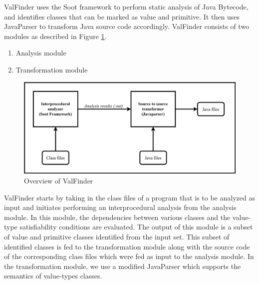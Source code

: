 \documentclass[12 pt, a4paper]{article}
\begin{document}
	

ValFinder uses the Soot framework \citep{soot} to perform static analysis
of Java Bytecode, and identifies classes that can be marked as value
and primitive. It then uses JavaParser \citep{JP} to transform Java source
code accordingly. ValFinder consists of two modules as described in Figure \ref{fig:Figure 3}.
\begin{enumerate}
	\item Analysis module
	\item Transformation module
\end{enumerate}


\begin{figure}[h]
	\vskip 0.2cm
	\centering
	\includegraphics[scale=0.25]{Images/ValFinder.jpg}
	\caption{Overview of ValFinder}
	\label{fig:Figure 3}
\end{figure}


ValFinder starts by taking in the class files of a program that is to be analyzed as input and initiates performing an interprocedural
analysis from the analysis module.  In this module, the dependencies between various
classes and the value-type satisfiability conditions are evaluated. The output of this 
module is a subset of value and primitive classes identified from the input set. This subset of identified classes is fed to 
the transformation module along with the source code of the corresponding class files which were fed 
as input to the analysis module. In the transformation module, we use a modified JavaParser which supports 
the semantics of value-types classes. 

\clearpage
\end{document}
